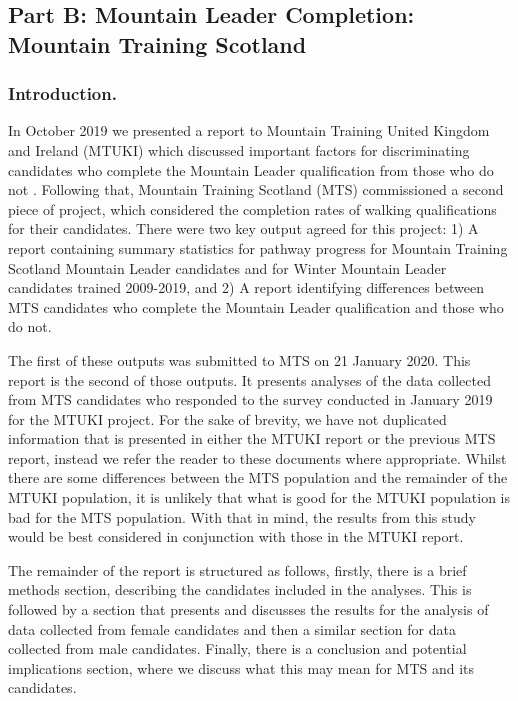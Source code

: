 \documentclass[
  12pt,
  a4paper,
]{book}
\begin{document}
\hypertarget{part-b-mountain-leader-completion-mountain-training-scotland}{%
\subsection{Part B: Mountain Leader Completion: Mountain Training Scotland}\label{part-b-mountain-leader-completion-mountain-training-scotland}}

\hypertarget{mts-part-b-introduction}{%
\subsubsection{Introduction.}\label{mts-part-b-introduction}}

In October 2019 we presented a report to Mountain Training United Kingdom and Ireland (MTUKI) which discussed important factors for discriminating candidates who complete the Mountain Leader qualification from those who do not \citep{Hardy2019b}. Following that, Mountain Training Scotland (MTS) commissioned a second piece of project, which considered the completion rates of walking qualifications for their candidates. There were two key output agreed for this project: 1) A report containing summary statistics for pathway progress for Mountain Training Scotland Mountain Leader candidates and for Winter Mountain Leader candidates trained 2009-2019, and 2) A report identifying differences between MTS candidates who complete the Mountain Leader qualification and those who do not.

The first of these outputs was submitted to MTS on 21 January 2020. This report is the second of those outputs. It presents analyses of the data collected from MTS candidates who responded to the survey conducted in January 2019 for the MTUKI project. For the sake of brevity, we have not duplicated information that is presented in either the MTUKI report or the previous MTS report, instead we refer the reader to these documents where appropriate. Whilst there are some differences between the MTS population and the remainder of the MTUKI population, it is unlikely that what is good for the MTUKI population is bad for the MTS population. With that in mind, the results from this study would be best considered in conjunction with those in the MTUKI report.

The remainder of the report is structured as follows, firstly, there is a brief methods section, describing the candidates included in the analyses. This is followed by a section that presents and discusses the results for the analysis of data collected from female candidates and then a similar section for data collected from male candidates. Finally, there is a conclusion and potential implications section, where we discuss what this may mean for MTS and its candidates.
\end{document}
